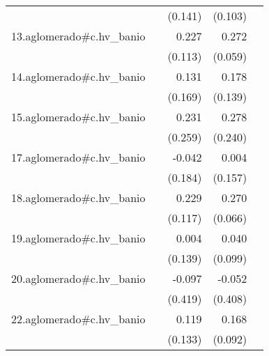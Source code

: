 {\begin{longtable}{l*{4}{D{.}{.}{-1}}}
            &                     &     (0.141)         &     (0.103)         &                     \\
\addlinespace
13.aglomerado#c.hv\_banio&                     &       0.227\sym{*}  &       0.272\sym{***}&                     \\
            &                     &     (0.113)         &     (0.059)         &                     \\
\addlinespace
14.aglomerado#c.hv\_banio&                     &       0.131         &       0.178         &                     \\
            &                     &     (0.169)         &     (0.139)         &                     \\
\addlinespace
15.aglomerado#c.hv\_banio&                     &       0.231         &       0.278         &                     \\
            &                     &     (0.259)         &     (0.240)         &                     \\
\addlinespace
17.aglomerado#c.hv\_banio&                     &      -0.042         &       0.004         &                     \\
            &                     &     (0.184)         &     (0.157)         &                     \\
\addlinespace
18.aglomerado#c.hv\_banio&                     &       0.229\sym{*}  &       0.270\sym{***}&                     \\
            &                     &     (0.117)         &     (0.066)         &                     \\
\addlinespace
19.aglomerado#c.hv\_banio&                     &       0.004         &       0.040         &                     \\
            &                     &     (0.139)         &     (0.099)         &                     \\
\addlinespace
20.aglomerado#c.hv\_banio&                     &      -0.097         &      -0.052         &                     \\
            &                     &     (0.419)         &     (0.408)         &                     \\
\addlinespace
22.aglomerado#c.hv\_banio&                     &       0.119         &       0.168         &                     \\
            &                     &     (0.133)         &     (0.092)         &                     \\

\end{longtable}}
